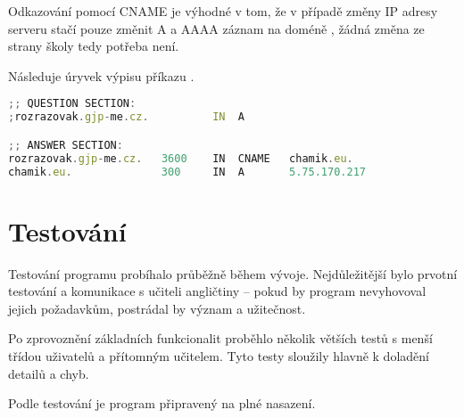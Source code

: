 Odkazování pomocí CNAME je výhodné v tom, že v případě změny IP adresy serveru stačí pouze změnit A a AAAA záznam na doméně , žádná změna ze strany školy tedy potřeba není.

Následuje úryvek výpisu příkazu .

\begin{lstlisting}[language=JavaScript,caption={Úryvek výpisu programu dig}]
;; QUESTION SECTION:
;rozrazovak.gjp-me.cz.		    IN	A

;; ANSWER SECTION:
rozrazovak.gjp-me.cz.	3600    IN	CNAME	chamik.eu.
chamik.eu.		        300	    IN	A	    5.75.170.217
\end{lstlisting}

\section{Testování}

Testování programu probíhalo průběžně během vývoje. Nejdůležitější bylo prvotní testování a komunikace s učiteli angličtiny -- pokud by program nevyhovoval jejich požadavkům, postrádal by význam a užitečnost.

Po zprovoznění základních funkcionalit proběhlo několik větších testů s menší třídou uživatelů a přítomným učitelem. Tyto testy sloužily hlavně k doladění detailů a chyb.

Podle testování je program připravený na plné nasazení.

